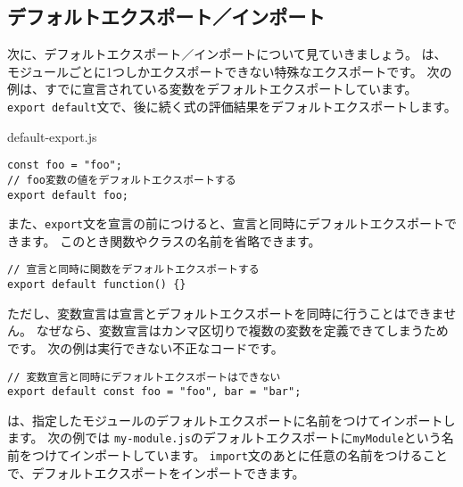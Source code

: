\hypertarget{default-export-import}{%
\subsection{デフォルトエクスポート／インポート}\label{default-export-import}}

次に、デフォルトエクスポート／インポートについて見ていきましょう。
\textbf{}は、モジュールごとに1つしかエクスポートできない特殊なエクスポートです。
次の例は、すでに宣言されている変数をデフォルトエクスポートしています。
\texttt{export default}文で、後に続く式の評価結果をデフォルトエクスポートします。

\begin{listtitle}
default-export.js
\end{listtitle}
\begin{lstlisting}
const foo = "foo";
// foo変数の値をデフォルトエクスポートする
export default foo;
\end{lstlisting}
\listend

また、\texttt{export}文を宣言の前につけると、宣言と同時にデフォルトエクスポートできます。
このとき関数やクラスの名前を省略できます。

\begin{lstlisting}
// 宣言と同時に関数をデフォルトエクスポートする
export default function() {}
\end{lstlisting}
\newpage
ただし、変数宣言は宣言とデフォルトエクスポートを同時に行うことはできません。
なぜなら、変数宣言はカンマ区切りで複数の変数を定義できてしまうためです。
次の例は実行できない不正なコードです。\enlargethispage{\baselineskip}

\begin{lstlisting}
// 変数宣言と同時にデフォルトエクスポートはできない
export default const foo = "foo", bar = "bar";
\end{lstlisting}

\textbf{}は、指定したモジュールのデフォルトエクスポートに名前をつけてインポートします。
次の例では
\texttt{my-module.js}のデフォルトエクスポートに\texttt{myModule}という名前をつけてインポートしています。
\texttt{import}文のあとに任意の名前をつけることで、デフォルトエクスポートをインポートできます。

